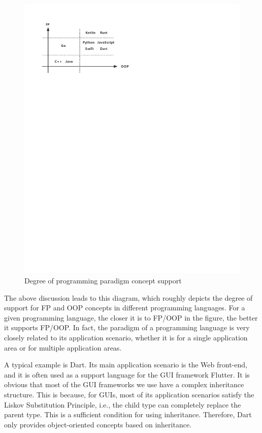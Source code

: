 \begin{figure}[htbp]
    \centerline{\includegraphics[scale=0.8]{figures/paradigm}}
    \caption{Degree of programming paradigm concept support}
    \label{fig:paradigm}
\end{figure}

The above discussion leads to this diagram, which roughly depicts the degree of support for FP and OOP concepts in different programming languages. For a given programming language, the closer it is to FP/OOP in the figure, the better it supports FP/OOP. In fact, the paradigm of a programming language is very closely related to its application scenario, whether it is for a single application area or for multiple application areas.

A typical example is Dart. Its main application scenario is the Web front-end, and it is often used as a support language for the GUI framework Flutter. It is obvious that most of the GUI frameworks we use have a complex inheritance structure. This is because, for GUIs, most of its application scenarios satisfy the Liskov Substitution Principle, i.e., the child type can completely replace the parent type. This is a sufficient condition for using inheritance. Therefore, Dart only provides object-oriented concepts based on inheritance.

